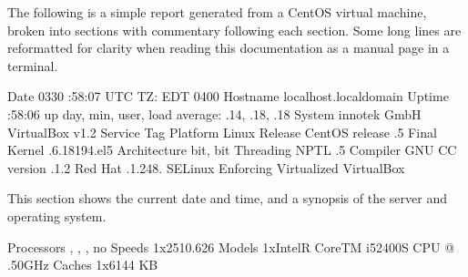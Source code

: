 \documentclass[letterpaper,10pt,english]{sphinxmanual}
\begin{document}
The following is a simple report generated from a CentOS virtual machine,
broken into sections with commentary following each section. Some long lines
are reformatted for clarity when reading this documentation as a manual page in
a terminal.

\begin{sphinxVerbatim}[commandchars=\\\{\}]
        Date  \PYGZhy{}03\PYGZhy{}30 :58:07 UTC  TZ: EDT \PYGZhy{}0400
    Hostname  localhost.localdomain
      Uptime  :58:06 up  day,  min,  user,
               load average: .14, .18, .18
      System  innotek GmbH VirtualBox v1.2 
 Service Tag  
    Platform  Linux
     Release  CentOS release .5 Final
      Kernel  .6.18\PYGZhy{}194.el5
Architecture    \PYGZhy{}bit,   \PYGZhy{}bit
   Threading  NPTL .5
    Compiler  GNU CC version .1.2  Red Hat .1.2\PYGZhy{}48.
     SELinux  Enforcing
 Virtualized  VirtualBox
\end{sphinxVerbatim}

This section shows the current date and time, and a synopsis of the server and
operating system.

\begin{sphinxVerbatim}[commandchars=\\\{\}]
  Processors    ,   ,   ,   no
      Speeds  1x2510.626
      Models  1xIntelR CoreTM i5\PYGZhy{}2400S CPU @ .50GHz
      Caches  1x6144 KB
\end{sphinxVerbatim}
\end{document}
